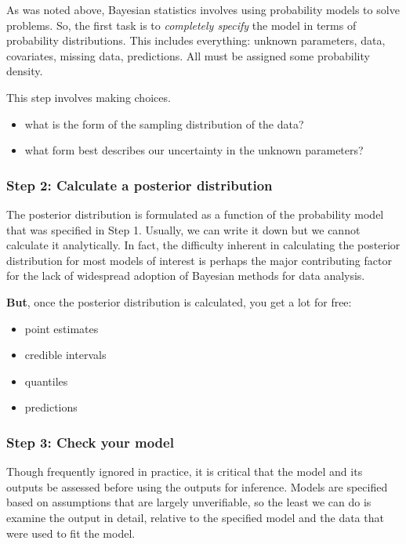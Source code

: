 \documentclass[11pt]{article}
\providecommand{\tightlist}{%
      \setlength{\itemsep}{0pt}\setlength{\parskip}{0pt}}
\begin{document}
As was noted above, Bayesian statistics involves using probability
models to solve problems. So, the first task is to \emph{completely
specify} the model in terms of probability distributions. This includes
everything: unknown parameters, data, covariates, missing data,
predictions. All must be assigned some probability density.

This step involves making choices.

\begin{itemize}
\tightlist
\item
  what is the form of the sampling distribution of the data?
\item
  what form best describes our uncertainty in the unknown parameters?
\end{itemize}

\hypertarget{step-2-calculate-a-posterior-distribution}{%
\subsubsection{Step 2: Calculate a posterior
distribution}\label{step-2-calculate-a-posterior-distribution}}

The posterior distribution is formulated as a function of the
probability model that was specified in Step 1. Usually, we can write it
down but we cannot calculate it analytically. In fact, the difficulty
inherent in calculating the posterior distribution for most models of
interest is perhaps the major contributing factor for the lack of
widespread adoption of Bayesian methods for data analysis.

\textbf{But}, once the posterior distribution is calculated, you get a
lot for free:

\begin{itemize}
\tightlist
\item
  point estimates
\item
  credible intervals
\item
  quantiles
\item
  predictions
\end{itemize}

\hypertarget{step-3-check-your-model}{%
\subsubsection{Step 3: Check your model}\label{step-3-check-your-model}}

Though frequently ignored in practice, it is critical that the model and
its outputs be assessed before using the outputs for inference. Models
are specified based on assumptions that are largely unverifiable, so the
least we can do is examine the output in detail, relative to the
specified model and the data that were used to fit the model.
\end{document}
